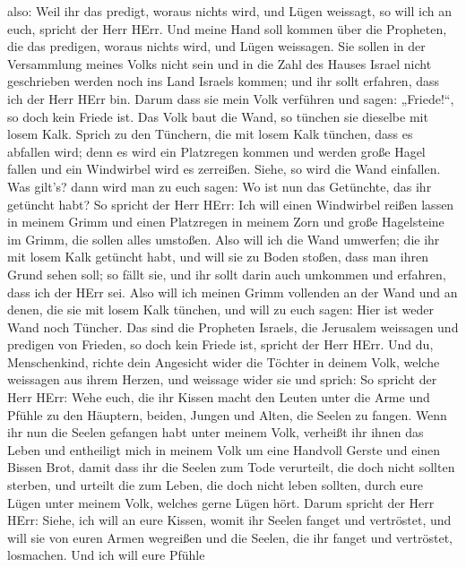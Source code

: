 also: Weil ihr das predigt, woraus nichts wird, und Lügen weissagt, so
will ich an euch, spricht der Herr HErr.  Und meine Hand
soll kommen über die Propheten, die das predigen, woraus nichts wird,
und Lügen weissagen. Sie sollen in der Versammlung meines Volks nicht
sein und in die Zahl des Hauses Israel nicht geschrieben werden noch ins
Land Israels kommen; und ihr sollt erfahren, dass ich der Herr HErr bin.
 Darum dass sie mein Volk verführen und sagen:
„Friede!{}``, so doch kein Friede ist. Das Volk baut die Wand, so
tünchen sie dieselbe mit losem Kalk.  Sprich zu den
Tünchern, die mit losem Kalk tünchen, dass es abfallen wird; denn es
wird ein Platzregen kommen und werden große Hagel fallen und ein
Windwirbel wird es zerreißen.  Siehe, so wird die Wand
einfallen. Was gilt's? dann wird man zu euch sagen: Wo ist nun das
Getünchte, das ihr getüncht habt?  So spricht der Herr
HErr: Ich will einen Windwirbel reißen lassen in meinem Grimm und einen
Platzregen in meinem Zorn und große Hagelsteine im Grimm, die sollen
alles umstoßen.  Also will ich die Wand umwerfen; die ihr
mit losem Kalk getüncht habt, und will sie zu Boden stoßen, dass man
ihren Grund sehen soll; so fällt sie, und ihr sollt darin auch umkommen
und erfahren, dass ich der HErr sei.  Also will ich meinen
Grimm vollenden an der Wand und an denen, die sie mit losem Kalk
tünchen, und will zu euch sagen: Hier ist weder Wand noch Tüncher.
 Das sind die Propheten Israels, die Jerusalem weissagen
und predigen von Frieden, so doch kein Friede ist, spricht der Herr
HErr.  Und du, Menschenkind, richte dein Angesicht wider
die Töchter in deinem Volk, welche weissagen aus ihrem Herzen, und
weissage wider sie  und sprich: So spricht der Herr HErr:
Wehe euch, die ihr Kissen macht den Leuten unter die Arme und Pfühle zu
den Häuptern, beiden, Jungen und Alten, die Seelen zu fangen. Wenn ihr
nun die Seelen gefangen habt unter meinem Volk, verheißt ihr ihnen das
Leben  und entheiligt mich in meinem Volk um eine Handvoll
Gerste und einen Bissen Brot, damit dass ihr die Seelen zum Tode
verurteilt, die doch nicht sollten sterben, und urteilt die zum Leben,
die doch nicht leben sollten, durch eure Lügen unter meinem Volk,
welches gerne Lügen hört.  Darum spricht der Herr HErr:
Siehe, ich will an eure Kissen, womit ihr Seelen fanget und vertröstet,
und will sie von euren Armen wegreißen und die Seelen, die ihr fanget
und vertröstet, losmachen.  Und ich will eure Pfühle
